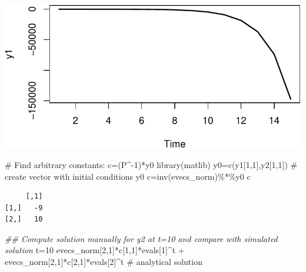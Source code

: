 \documentclass[
  letterpaper,
  DIV=11,
  numbers=noendperiod]{scrreprt}
\newenvironment{Shaded}{\begin{snugshade}}{\end{snugshade}}
\newcommand{\CommentTok}[1]{\textcolor[rgb]{0.37,0.37,0.37}{#1}}
\newcommand{\DecValTok}[1]{\textcolor[rgb]{0.68,0.00,0.00}{#1}}
\newcommand{\DocumentationTok}[1]{\textcolor[rgb]{0.37,0.37,0.37}{\textit{#1}}}
\newcommand{\FunctionTok}[1]{\textcolor[rgb]{0.28,0.35,0.67}{#1}}
\newcommand{\NormalTok}[1]{\textcolor[rgb]{0.00,0.23,0.31}{#1}}
\newcommand{\OtherTok}[1]{\textcolor[rgb]{0.00,0.23,0.31}{#1}}
\newcommand{\SpecialCharTok}[1]{\textcolor[rgb]{0.37,0.37,0.37}{#1}}
\begin{document}
\includegraphics{intro_stability_analysis_files/figure-pdf/stab_analysis2-1.pdf}

\begin{Shaded}
\begin{Highlighting}[]
\CommentTok{\# Find arbitrary constants: c=(P\^{}{-}1)*y0}
\FunctionTok{library}\NormalTok{(matlib)}
\NormalTok{y0}\OtherTok{=}\FunctionTok{c}\NormalTok{(y1[}\DecValTok{1}\NormalTok{,}\DecValTok{1}\NormalTok{],y2[}\DecValTok{1}\NormalTok{,}\DecValTok{1}\NormalTok{])  }\CommentTok{\# create vector with initial conditions y0}
\NormalTok{c}\OtherTok{=}\FunctionTok{inv}\NormalTok{(evecs\_norm)}\SpecialCharTok{\%*\%}\NormalTok{y0}
\NormalTok{c}
\end{Highlighting}
\end{Shaded}

\begin{verbatim}
     [,1]
[1,]   -9
[2,]   10
\end{verbatim}

\begin{Shaded}
\begin{Highlighting}[]
\DocumentationTok{\#\# Compute solution manually for y2 at t=10 and compare with simulated solution}
\NormalTok{t}\OtherTok{=}\DecValTok{10}
\NormalTok{evecs\_norm[}\DecValTok{2}\NormalTok{,}\DecValTok{1}\NormalTok{]}\SpecialCharTok{*}\NormalTok{c[}\DecValTok{1}\NormalTok{,}\DecValTok{1}\NormalTok{]}\SpecialCharTok{*}\NormalTok{evals[}\DecValTok{1}\NormalTok{]}\SpecialCharTok{\^{}}\NormalTok{t }\SpecialCharTok{+}\NormalTok{ evecs\_norm[}\DecValTok{2}\NormalTok{,}\DecValTok{1}\NormalTok{]}\SpecialCharTok{*}\NormalTok{c[}\DecValTok{2}\NormalTok{,}\DecValTok{1}\NormalTok{]}\SpecialCharTok{*}\NormalTok{evals[}\DecValTok{2}\NormalTok{]}\SpecialCharTok{\^{}}\NormalTok{t }\CommentTok{\# analytical solution}
\end{Highlighting}
\end{Shaded}
\end{document}
